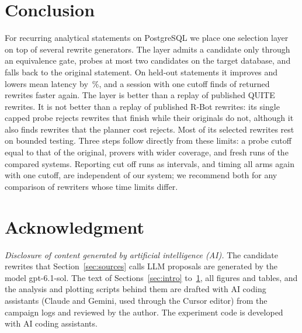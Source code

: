 \documentclass[conference]{IEEEtran}
\newcommand{\pc}[1]{#1\,\%}
\begin{document}
\section{Conclusion}
\label{sec:conclusion}

For recurring analytical statements on PostgreSQL we place one selection layer on top of several rewrite generators.
The layer admits a candidate only through an equivalence gate, probes at most two candidates on the target database, and falls back to the original statement.
On \HeldAllN{} held-out statements it improves \HeldAllOursFaster{} and lowers mean latency by \pc{\HeldAllOursRedU}, and a session with one cutoff finds \ValHeldAllOursFaster{} of \ValHeldAllOursRewrites{} returned rewrites faster again.
The layer is better than a replay of published QUITE rewrites.
It is not better than a replay of published R-Bot rewrites: its single capped probe rejects rewrites that finish while their originals do not, although it also finds rewrites that the planner cost rejects.
Most of its selected rewrites rest on bounded testing.
Three steps follow directly from these limits: a probe cutoff equal to that of the original, provers with wider coverage, and fresh runs of the compared systems.
Reporting cut off runs as intervals, and timing all arms again with one cutoff, are independent of our system; we recommend both for any comparison of rewriters whose time limits differ.

\label{lastcontent}%

\section*{Acknowledgment}
\emph{Disclosure of content generated by artificial intelligence (AI).}
The candidate rewrites that Section~\ref{sec:sources} calls LLM proposals are generated by the model gpt-6.1-sol.
The text of Sections~\ref{sec:intro} to~\ref{sec:conclusion}, all figures and tables, and the analysis and plotting scripts behind them are drafted with AI coding assistants (Claude and Gemini, used through the Cursor editor) from the campaign logs and reviewed by the author.
The experiment code is developed with AI coding assistants.
\end{document}
